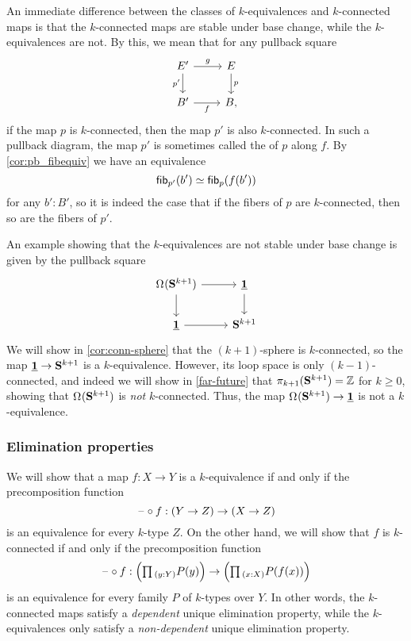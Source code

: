 \begin{rmk}
  An immediate difference between the classes of $k$-equivalences and $k$-connected maps is that the $k$-connected maps are stable under base change, while the $k$-equivalences are not. By this, we mean that for any pullback square
  \begin{equation*}
    \begin{tikzcd}
      E' \arrow[d,swap,"{p'}"] \arrow[r,"g"] & E \arrow[d,"p"] \\
      B' \arrow[r,swap,"f"] & B,
    \end{tikzcd}
  \end{equation*}
  if the map $p$ is $k$-connected, then the map $p'$ is also $k$-connected. In such a pullback diagram, the map $p'$ is sometimes called the  of $p$ along $f$. By \cref{cor:pb_fibequiv} we have an equivalence
  \begin{equation*}
    \mathsf{fib}_{p'}(b')\simeq\mathsf{fib}_{p}(f(b'))
  \end{equation*}
  for any $b':B'$, so it is indeed the case that if the fibers of $p$ are $k$-connected, then so are the fibers of $p'$.

  An example showing that the $k$-equivalences are not stable under base change is given by the pullback square
  \begin{equation*}
    \begin{tikzcd}
      \loopspace{\sphere{k+1}} \arrow[r] \arrow[d] & \unit \arrow[d] \\
      \unit \arrow[r] & \sphere{k+1}
    \end{tikzcd}
  \end{equation*}
  We will show in \cref{cor:conn-sphere} that the $(k+1)$-sphere is $k$-connected, so the map $\underline{\mathbf{1}}\to\mathbf{S}^{k+1}$ is a $k$-equivalence. However, its loop space is only $(k-1)$-connected, and indeed we will show in \cref{far-future} that
  $\pi_{k+1}(\mathbf{S}^{k+1})={\mathbb{Z}}$ for $k\geq 0$, showing that $\Omega^{}(\mathbf{S}^{k+1})$ is \emph{not} $k$-connected. Thus, the map $\Omega^{}(\mathbf{S}^{k+1})\to\underline{\mathbf{1}}$ is not a $k$-equivalence.
\end{rmk}

\subsubsection{Elimination properties}
We will show that a map $f:X\to Y$ is a $k$-equivalence if and only if the precomposition function
\begin{equation*}
  \mathord{\hspace{1pt}\text{--}\hspace{1pt}}\circ f : (Y\to Z)\to (X\to Z)
\end{equation*}
is an equivalence for every $k$-type $Z$. On the other hand, we will show that $f$ is $k$-connected if and only if the precomposition function
\begin{equation*}
  \blank\circ f : \Big(\prd{y:Y}P(y)\Big)\to\Big(\prd{x:X}P(f(x))\Big)
\end{equation*}
is an equivalence for every family $P$ of $k$-types over $Y$. In other words, the $k$-connected maps satisfy a \emph{dependent} unique elimination property, while the $k$-equivalences only satisfy a \emph{non-dependent} unique elimination property.

